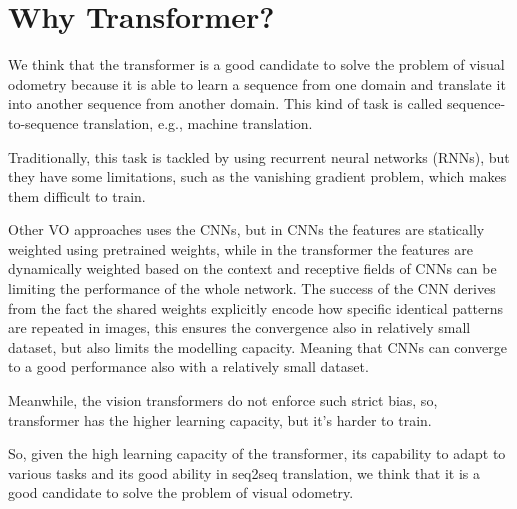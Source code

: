 \section{Why Transformer?}\label{sec:why-transformer}

We think that the transformer is a good candidate to solve the problem of visual odometry because it is able to learn a sequence from one domain and translate it into another sequence from another domain.
This kind of task is called sequence-to-sequence translation, e.g., machine translation.

Traditionally, this task is tackled by using recurrent neural networks (RNNs), but they have some limitations, such as the vanishing gradient problem, which makes them difficult to train.

Other VO approaches uses the CNNs, but in CNNs the features are statically weighted using pretrained weights, while in the transformer the features are dynamically weighted based on the context and receptive fields of CNNs can be limiting the performance of the whole network.
The success of the CNN derives from the fact the shared weights explicitly encode how specific identical patterns are repeated in images, this ensures the convergence also in relatively small dataset, but also limits the modelling capacity.
Meaning that CNNs can converge to a good performance also with a relatively small dataset.

Meanwhile, the vision transformers do not enforce such strict bias, so, transformer has the higher learning capacity, but it's harder to train.

So, given the high learning capacity of the transformer, its capability to adapt to various tasks and its good ability in seq2seq translation, we think that it is a good candidate to solve the problem of visual odometry.
